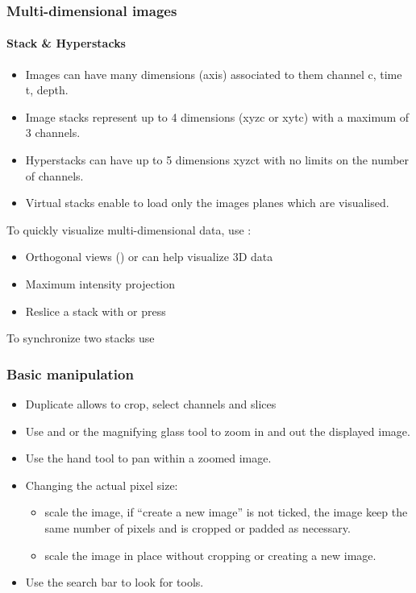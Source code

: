 \documentclass[ignorenonframetext,aspectratio=169,10pt,xcolor=table]{beamer}
\begin{document}
\begin{frame} \frametitle{Multi-dimensional images}
  \framesubtitle{Stack \& Hyperstacks}
  \begin{itemize}
  \item Images can have many dimensions (axis) associated to them
    channel c, time t, depth.
  \item Image stacks represent up to 4 dimensions (xyzc or xytc) with
    a maximum of 3 channels.
  \item Hyperstacks can have up to 5 dimensions xyzct with no limits
    on the number of channels.
  \item Virtual stacks enable to load only the images planes which are
    visualised.
  \end{itemize} To quickly visualize multi-dimensional data, use :
  \begin{itemize}
  \item Orthogonal views () or
     can help visualize 3D data
  \item Maximum intensity projection 
  \item Reslice a stack with  or press \keys{/}
  \end{itemize} To synchronize two stacks use 
\end{frame}

\begin{frame} \frametitle{Basic manipulation}
  \begin{itemize} \setlength\itemsep{1em}
  \item Duplicate  allows to crop, select
    channels and slices
  \item Use \keys{{+}} and \keys{-} or the magnifying glass tool to zoom
    in and out the displayed image.
  \item Use the hand tool to pan within a zoomed image.
  \item Changing the actual pixel size:
    \begin{itemize}
    \item {} scale the image, if ``create a new
      image'' is not ticked, the image keep the same number of pixels and is
      cropped or padded as necessary.
    \item {} scale the image in place
      without cropping or creating a new image.
    \end{itemize}
  \item Use the search bar to look for tools.
  \end{itemize}
\end{frame}
\end{document}
